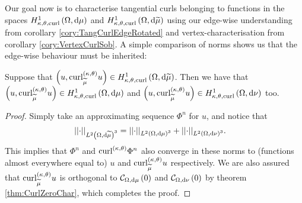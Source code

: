Our goal now is to characterise tangential curls belonging to functions in the spaces $\ktcurlSob{\ddom}{\ddmes}$ and $\ktcurlSob{\ddom}{\dddmes}$ using our edge-wise understanding from corollary \ref{cory:TangCurlEdgeRotated} and vertex-characterisation from corollary \ref{cory:VertexCurlSob}.
A simple comparison of norms shows us that the edge-wise behaviour must be inherited:
\begin{prop} \label{prop:TC-dddmesImpliesOthers}
	Suppose that $\bracs{u,\ktcurl{\dddmes}u}\in\ktcurlSob{\ddom}{\dddmes}$.
	Then we have that $\bracs{u,\ktcurl{\dddmes}u}\in\ktcurlSob{\ddom}{\ddmes}$ and $\bracs{u,\ktcurl{\dddmes}u}\in\ktcurlSob{\ddom}{\massMes}$ too.
\end{prop}
\begin{proof}
	Simply take an approximating sequence $\Phi^n$ for $u$, and notice that
	\begin{align*}
		\norm{\cdot}_{\ltwo{\ddom}{\dddmes}^3} &= \norm{\cdot}_{\ltwo{\ddom}{\ddmes}^3} + \norm{\cdot}_{\ltwo{\ddom}{\massMes}^3}.
	\end{align*}
	This implies that $\Phi^n$ and $\ktcurl{}\Phi^n$ also converge in these norms to (functions almost everywhere equal to) $u$ and $\ktcurl{\dddmes}u$ respectively.
	We are also assured that $\ktcurl{\dddmes}u$ is orthogonal to $\curlZero{\ddom}{\ddmes}$ and $\curlZero{\ddom}{\massMes}$ by theorem \ref{thm:CurlZeroChar}, which completes the proof.
\end{proof}


